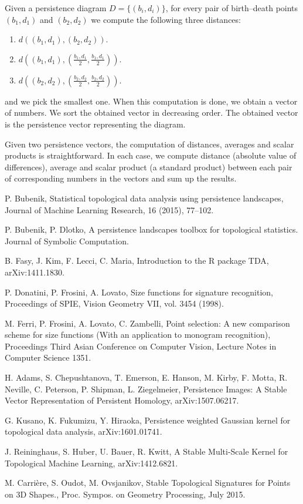 \documentclass[11pt]{article}
\begin{document}
Given a persistence diagram $D = \{ (b_i,d_i) \}$, for every pair of birth--death points $(b_1,d_1)$ and $(b_2,d_2)$ we compute the following three distances:
\begin{enumerate}
\item $d( (b_1,d_1) , (b_2,d_2) )$.
\item $d( (b_1,d_1) , (\frac{b_1,d_1}{2},\frac{b_1,d_1}{2}) )$.
\item $d( (b_2,d_2) , (\frac{b_2,d_2}{2},\frac{b_2,d_2}{2}) )$.
\end{enumerate}
and we pick the smallest one. When this computation is done, we obtain a vector of numbers. We sort the obtained vector in decreasing order. The obtained vector is the persistence vector representing the diagram.

Given two persistence vectors, the computation of distances, averages and scalar products is straightforward. In each case, we compute distance (absolute value of differences), average and scalar product (a standard product) between each pair of corresponding numbers in the vectors and sum up the results. 


\begin{thebibliography}{99}
  P. Bubenik, Statistical topological data analysis using persistence landscapes, Journal of Machine Learning Research, 16 (2015), 77–102.

 P. Bubenik, P. Dlotko, A persistence landscapes toolbox for topological statistics. Journal of Symbolic Computation.

 B. Fasy, J. Kim, F. Lecci, C. Maria, Introduction to the R package TDA, arXiv:1411.1830.

 P. Donatini, P. Frosini, A. Lovato, Size functions for signature recognition, Proceedings of SPIE, Vision Geometry VII, vol. 3454
(1998).

 M. Ferri, P. Frosini, A. Lovato, C. Zambelli, Point selection: A new comparison scheme for size functions (With an application to monogram recognition), Proceedings Third Asian Conference on Computer Vision, Lecture Notes in Computer Science 1351.

 H. Adams, S. Chepushtanova, T. Emerson, E. Hanson, M. Kirby, F. Motta, R. Neville, C. Peterson, P. Shipman, L. Ziegelmeier, Persistence Images: A Stable Vector Representation of Persistent Homology, arXiv:1507.06217.

 G. Kusano, K. Fukumizu, Y. Hiraoka, Persistence weighted Gaussian kernel for topological data analysis, arXiv:1601.01741.

 J. Reininghaus, S. Huber, U. Bauer, R. Kwitt, A Stable Multi-Scale Kernel for Topological Machine Learning, arXiv:1412.6821.

 M. Carrière, S. Oudot, M. Ovsjanikov, Stable Topological Signatures for Points on 3D Shapes., Proc. Sympos. on Geometry Processing, July 2015.

\end{thebibliography}
\end{document}
